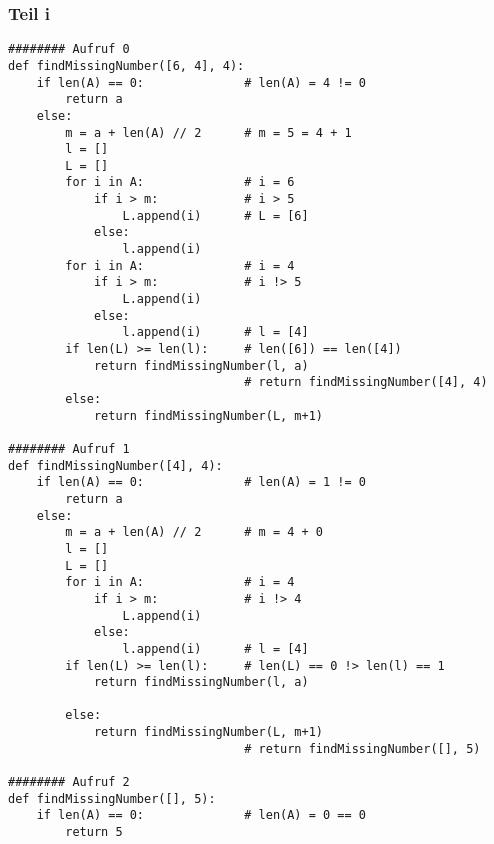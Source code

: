 \documentclass[a5paper]{article}
\theoremstyle{remark}
\begin{document}
\subsubsection{Teil i}
\begin{verbatim}
######## Aufruf 0
def findMissingNumber([6, 4], 4):
    if len(A) == 0:              # len(A) = 4 != 0
        return a
    else:
        m = a + len(A) // 2      # m = 5 = 4 + 1
        l = []
        L = []
        for i in A:              # i = 6
            if i > m:            # i > 5
                L.append(i)      # L = [6]
            else:
                l.append(i)
        for i in A:              # i = 4
            if i > m:            # i !> 5
                L.append(i)
            else:
                l.append(i)      # l = [4]
        if len(L) >= len(l):     # len([6]) == len([4])
            return findMissingNumber(l, a)
                                 # return findMissingNumber([4], 4)
        else:
            return findMissingNumber(L, m+1)

######## Aufruf 1
def findMissingNumber([4], 4):
    if len(A) == 0:              # len(A) = 1 != 0
        return a
    else:
        m = a + len(A) // 2      # m = 4 + 0
        l = []
        L = []
        for i in A:              # i = 4
            if i > m:            # i !> 4
                L.append(i)
            else:
                l.append(i)      # l = [4]
        if len(L) >= len(l):     # len(L) == 0 !> len(l) == 1
            return findMissingNumber(l, a)

        else:
            return findMissingNumber(L, m+1)
                                 # return findMissingNumber([], 5)

######## Aufruf 2
def findMissingNumber([], 5):
    if len(A) == 0:              # len(A) = 0 == 0
        return 5
\end{verbatim}
\end{document}

